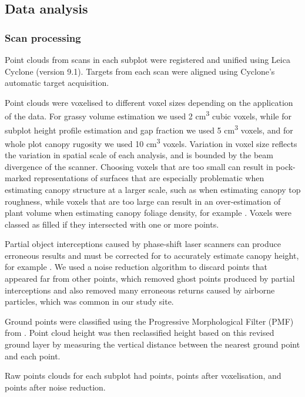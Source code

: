 \documentclass[11pt,a4paper]{article}
\newcommand{\textapprox}{\raisebox{0.5ex}{\texttildelow}}  %
\begin{document}
\subsection{Data analysis}

\subsubsection{Scan processing}

Point clouds from scans in each subplot were registered and unified using Leica Cyclone (version 9.1). Targets from each scan were aligned using Cyclone's automatic target acquisition. 

Point clouds were voxelised to different voxel sizes depending on the application of the data. For grassy volume estimation we used 2 cm\textsuperscript{3} cubic voxels, while for subplot height profile estimation and gap fraction we used 5 cm\textsuperscript{3} voxels, and for whole plot canopy rugosity we used 10 cm\textsuperscript{3} voxels. Variation in voxel size reflects the variation in spatial scale of each analysis, and is bounded by the beam divergence of the scanner. Choosing voxels that are too small can result in pock-marked representations of surfaces that are especially problematic when estimating canopy structure at a larger scale, such as when estimating canopy top roughness, while voxels that are too large can result in an over-estimation of plant volume when estimating canopy foliage density, for example \citep{Cifuentes2014}. Voxels were classed as filled if they intersected with one or more points.

Partial object interceptions caused by phase-shift laser scanners can produce erroneous results and must be corrected for to accurately estimate canopy height, for example \citep{}. We used a noise reduction algorithm to discard points that appeared far from other points, which removed ghost points produced by partial interceptions and also removed many erroneous returns caused by airborne particles, which was common in our study site.

Ground points were classified using the Progressive Morphological Filter (PMF) from \citep{Zhang2003}. Point cloud height was then reclassified height based on this revised ground layer by measuring the vertical distance between the nearest ground point and each point.

Raw points clouds for each subplot had \textapprox{}\rawpt{} points, \textapprox{}\voxelpt{} points after voxelisation, and \textapprox{}\subpt{} points after noise reduction.
\end{document}
